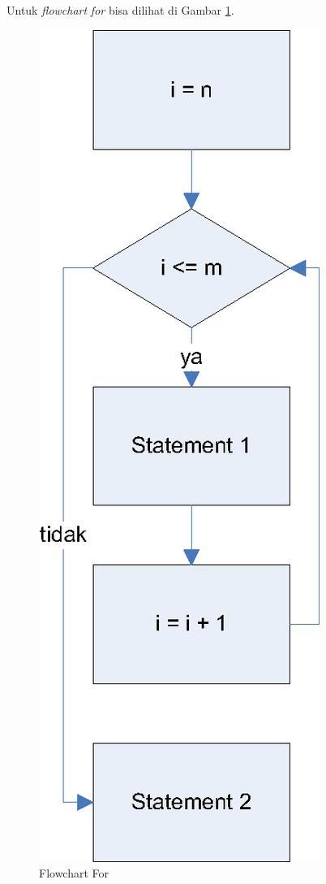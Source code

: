 Untuk \textit{flowchart} \textit{for} bisa dilihat di Gambar \ref{fig:flowchartFor}.
\begin{figure}%
\centering
\includegraphics[scale=0.6]{fig/flowchart-FOR.eps}%
\caption{Flowchart For}%
\label{fig:flowchartFor}%
\end{figure}


